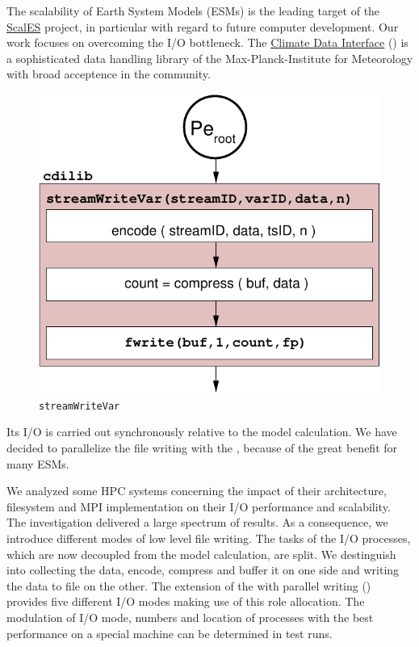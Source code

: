 The scalability of Earth System Models (ESMs) is the leading target of the 
\href{http://www.dkrz.de/Klimaforschung/dkrz-und-klimaforschung/infraproj/scales
}{ScalES}
project, in particular with regard to future computer development. Our work  
focuses on overcoming the I/O bottleneck.  The 
\href{https://code.zmaw.de/projects/cdi}{Climate Data Interface} ({\CDI}) is a 
sophisticated data handling library of 
the Max-Planck-Institute for Meteorology with broad acceptence in the 
community. 
\begin{figure}
\vspace{-10pt}
\centering
\includegraphics[scale=0.5]{../graphics/serial.pdf}
\vspace{-10pt}
\caption{{{\CDI} {\tt streamWriteVar}}}
\vspace{-10pt}
\end{figure}
Its I/O is carried out synchronously relative to the model calculation. 
We have decided to parallelize the file writing with the {\CDI}, because of the 
great benefit for many ESMs.
\smallskip 
 
We analyzed 
some HPC systems concerning the impact of their architecture, filesystem and 
MPI implementation on their I/O performance and scalability. The investigation 
delivered a large spectrum of results. As a consequence, 
we introduce different modes of low level file writing. The tasks 
of the I/O processes, which are now decoupled from the model calculation, are split.
We destinguish into collecting the data, encode, compress 
and buffer it on one side and writing the data to file on the other. The extension 
of the {\CDI} with parallel writing ({\pio}) provides five different I/O modes 
making use of this role allocation. The modulation of I/O mode, numbers and 
location of processes with the best performance on a 
special machine can be determined in test runs. 
\smallskip  

